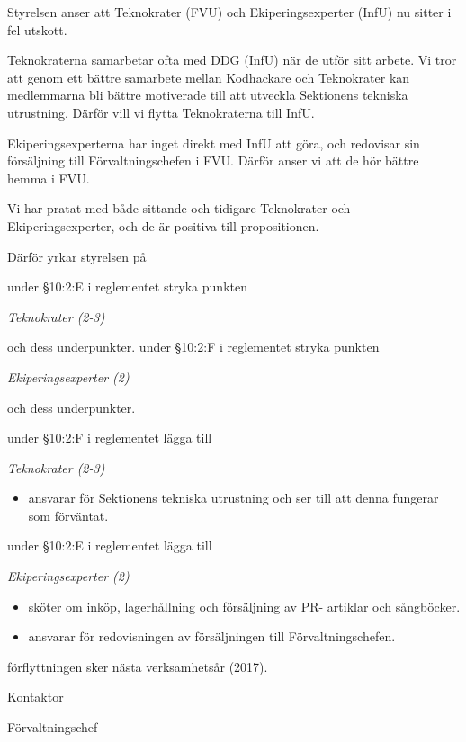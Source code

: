 \documentclass[../_main/handlingar.tex]{subfiles}
\begin{document}

Styrelsen anser att Teknokrater (FVU) och Ekiperingsexperter (InfU) nu sitter i fel utskott.

Teknokraterna samarbetar ofta med DDG (InfU) när de utför sitt arbete. Vi tror att genom ett bättre samarbete mellan Kodhackare och Teknokrater kan medlemmarna bli bättre motiverade till att utveckla Sektionens tekniska utrustning. Därför vill vi flytta Teknokraterna till InfU.

Ekiperingsexperterna har inget direkt med InfU att göra, och redovisar sin försäljning till Förvaltningschefen i FVU. Därför anser vi att de hör bättre hemma i FVU.

Vi har pratat med både sittande och tidigare Teknokrater och Ekiperingsexperter, och de är positiva till propositionen.

Därför yrkar styrelsen på
\begin{attsatser}
    \att under \S10:2:E i reglementet stryka punkten\par
    {\it
    Teknokrater (2-3)
    }\par
    och dess underpunkter.
    \att under \S10:2:F i reglementet stryka punkten\par
    {\it
    Ekiperingsexperter (2)
    }\par
    och dess underpunkter.

    \att under \S10:2:F i reglementet lägga till\par
    {\it
    Teknokrater (2-3)
    \begin{itemize}[label={--}, topsep=0cm, noitemsep]
        \item ansvarar för Sektionens tekniska utrustning och ser till att denna fungerar som förväntat.
    \end{itemize}
    }

    \att under \S10:2:E i reglementet lägga till\par
    {\it
    Ekiperingsexperter (2)
    \begin{itemize}[label={--}, topsep=0cm, noitemsep]
        \item sköter om inköp, lagerhållning och försäljning av PR- artiklar och sångböcker.
        \item ansvarar för redovisningen av försäljningen till Förvaltningschefen.
    \end{itemize}
    }
    \att förflyttningen sker nästa verksamhetsår (2017).
\end{attsatser}

\begin{signatures}{2}
    \ist
    \signature{Erik Månsson}{Kontaktor}
    \signature{Anders Nilsson}{Förvaltningschef}
\end{signatures}
\end{document}
